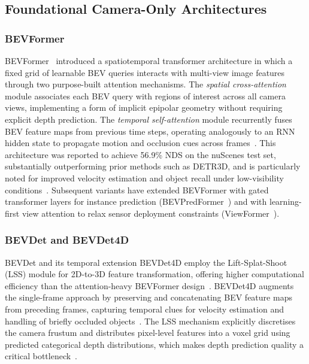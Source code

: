 \documentclass[12pt, a4paper]{article}
\begin{document}
\subsection{Foundational Camera-Only Architectures}

\subsubsection{BEVFormer}

BEVFormer~\cite{ref48, ref49} introduced a spatiotemporal transformer architecture in which
a fixed grid of learnable BEV queries interacts with multi-view image features through two
purpose-built attention mechanisms. The \emph{spatial cross-attention} module associates
each BEV query with regions of interest across all camera views, implementing a form of
implicit epipolar geometry without requiring explicit depth prediction. The \emph{temporal
self-attention} module recurrently fuses BEV feature maps from previous time steps,
operating analogously to an RNN hidden state to propagate motion and occlusion cues across
frames~\cite{ref49}. This architecture was reported to achieve 56.9\% NDS on the nuScenes
test set, substantially outperforming prior methods such as DETR3D, and is particularly
noted for improved velocity estimation and object recall under low-visibility
conditions~\cite{ref48}. Subsequent variants have extended BEVFormer with gated
transformer layers for instance prediction (BEVPredFormer~\cite{ref51}) and with
learning-first view attention to relax sensor deployment constraints
(ViewFormer~\cite{ref57}).

\subsubsection{BEVDet and BEVDet4D}

BEVDet and its temporal extension BEVDet4D employ the Lift-Splat-Shoot (LSS) module for
2D-to-3D feature transformation, offering higher computational efficiency than the
attention-heavy BEVFormer design~\cite{ref7, ref8}. BEVDet4D augments the single-frame
approach by preserving and concatenating BEV feature maps from preceding frames, capturing
temporal clues for velocity estimation and handling of briefly occluded
objects~\cite{ref7, ref8, ref16, ref18}. The LSS mechanism explicitly discretises the camera
frustum and distributes pixel-level features into a voxel grid using predicted categorical
depth distributions, which makes depth prediction quality a critical
bottleneck~\cite{ref7, ref8}.
\end{document}
